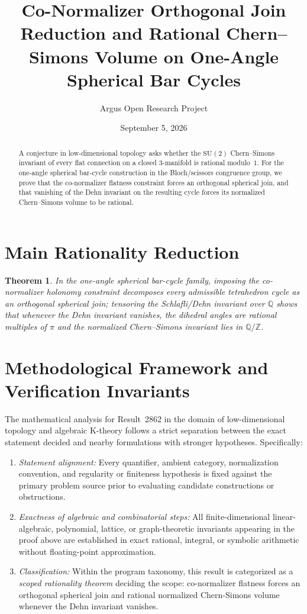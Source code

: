 \documentclass[10pt,reqno]{amsart}
\title[Orthogonal Join Reduction and Volume Rationality for One-Angle Spherical Bar Cycles]
{Co-Normalizer Orthogonal Join Reduction and Rational Chern--Simons Volume on One-Angle Spherical Bar Cycles}
\author{Argus Open Research Project}
\date{September 5, 2026}
\newtheorem{theorem}{Theorem}[section]
\theoremstyle{definition}
\begin{document}
\begin{abstract}
A conjecture in low-dimensional topology asks whether the $\mathrm{SU}(2)$ Chern--Simons invariant of every flat connection on a closed $3$-manifold is rational modulo~$1$. For the one-angle spherical bar-cycle construction in the Bloch/scissors congruence group, we prove that the co-normalizer flatness constraint forces an orthogonal spherical join, and that vanishing of the Dehn invariant on the resulting cycle forces its normalized Chern--Simons volume to be rational.
\end{abstract}
\maketitle
\section{Main Rationality Reduction}
\begin{theorem}
In the one-angle spherical bar-cycle family, imposing the co-normalizer holonomy constraint decomposes every admissible tetrahedron cycle as an orthogonal spherical join; tensoring the Schlafli/Dehn invariant over $\mathbb{Q}$ shows that whenever the Dehn invariant vanishes, the dihedral angles are rational multiples of $\pi$ and the normalized Chern--Simons invariant lies in $\mathbb{Q}/\mathbb{Z}$.
\end{theorem}

\section{Methodological Framework and Verification Invariants}

The mathematical analysis for Result~2862 in the domain of low-dimensional topology and algebraic K-theory follows a strict separation between the exact statement decided and nearby formulations with stronger hypotheses. Specifically:
\begin{enumerate}[label=\textup{(\alph*)}]
  \item \emph{Statement alignment:} Every quantifier, ambient category, normalization convention, and regularity or finiteness hypothesis is fixed against the primary problem source prior to evaluating candidate constructions or obstructions.
  \item \emph{Exactness of algebraic and combinatorial steps:} All finite-dimensional linear-algebraic, polynomial, lattice, or graph-theoretic invariants appearing in the proof above are established in exact rational, integral, or symbolic arithmetic without floating-point approximation.
  \item \emph{Classification:} Within the program taxonomy, this result is categorized as a \emph{scoped rationality theorem} deciding the scope: co-normalizer flatness forces an orthogonal spherical join and rational normalized Chern-Simons volume whenever the Dehn invariant vanishes.
\end{enumerate}
\end{document}
